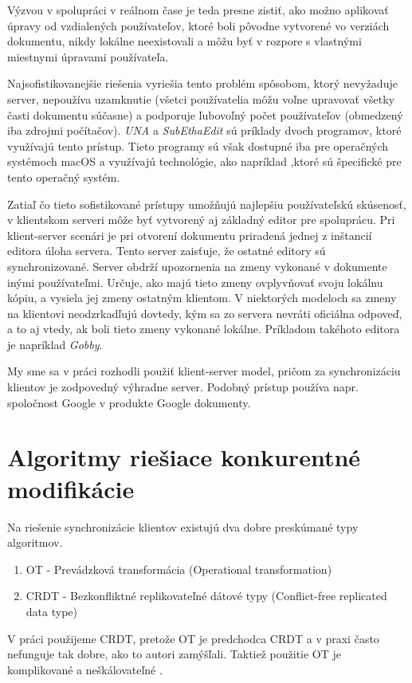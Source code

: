 Výzvou v spolupráci v reálnom čase je teda presne zistiť, ako možno aplikovať úpravy
od vzdialených používateľov, ktoré boli pôvodne vytvorené vo verziách dokumentu,
nikdy lokálne neexistovali a môžu byť v rozpore s vlastnými miestnymi úpravami používateľa.

Najsofistikovanejšie riešenia vyriešia tento problém spôsobom, ktorý nevyžaduje server,
nepoužíva uzamknutie (všetci používatelia môžu voľne upravovať všetky časti dokumentu súčasne) 
a podporuje ľubovoľný počet používateľov (obmedzený iba zdrojmi počítačov). 
\textit{UNA} a \textit{SubEthaEdit} sú príklady dvoch programov, ktoré využívajú tento prístup.
Tieto programy sú však dostupné iba pre operačných systémoch macOS a využívajú technológie,
ako napríklad \cite{bonjour},ktoré sú špecifické pre tento operačný systém.

Zatiaľ čo tieto sofistikované prístupy umožňujú najlepšiu používateľskú skúsenosť,
v klientskom serveri môže byť vytvorený aj základný editor pre spoluprácu. Pri klient-server 
scenári je pri otvorení dokumentu priradená jednej z inštancií editora úloha servera.
Tento server zaisťuje, že ostatné editory sú synchronizované. Server obdrží upozornenia
na zmeny vykonané v dokumente inými používateľmi. 
Určuje, ako majú tieto zmeny ovplyvňovať svoju lokálnu kópiu, a vysiela jej zmeny ostatným klientom.
V niektorých modeloch sa zmeny na klientovi neodzrkadľujú dovtedy,
kým sa zo servera nevráti oficiálna odpoveď, a to aj vtedy, ak boli tieto zmeny vykonané lokálne.
Príkladom takéhoto editora je napríklad \textit{Gobby}.

My sme sa v práci rozhodli použiť klient-server model, pričom za synchronizáciu klientov
je zodpovedný výhradne server. Podobný prístup používa napr. spoločnost Google v produkte 
Google dokumenty.

\section{Algoritmy riešiace konkurentné modifikácie}
Na riešenie synchronizácie klientov existujú dva dobre preskúmané typy algoritmov.
\begin{enumerate}
  \item OT - Prevádzková transformácia (Operational transformation)
  \item CRDT - Bezkonfliktné replikovateľné dátové typy (Conflict-free replicated data type)
\end{enumerate}

V práci použijeme CRDT, pretože OT je predchodca CRDT a v praxi často nefunguje tak dobre,
ako to autori zamýšľali. Taktiež použitie OT je komplikované a neškálovateľné \cite{ot_nonscalable}.
